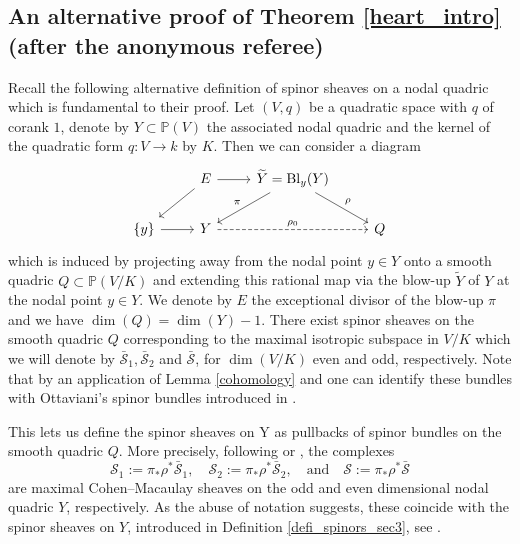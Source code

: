 \documentclass[a4paper, twoside, 11pt]{amsart}
\theoremstyle{definition}
\theoremstyle{remark}
\numberwithin{equation}{theorem}
\DeclareMathOperator{\bl}{Bl}
\begin{document}
\subsection{An alternative proof of Theorem \ref{heart_intro} (after the anonymous referee)}\label{proof_referee}
Recall the following alternative definition of spinor sheaves on a nodal quadric which is fundamental to their proof. Let $(V,q)$ be a quadratic space with $q$ of corank $1$, denote by $Y\subset \mathbb{P}(V)$ the associated nodal quadric and the kernel of the quadratic form $q\colon V \to k$ by $K$. Then we can consider a diagram 
\begin{equation*}\label{setting}
	\begin{tikzcd}
                & E \arrow[r] \arrow[ld]         & \widetilde{Y} = \bl_y(Y) \arrow[ld, "\pi"'] \arrow[rd, "\rho"] &      \\
\{y\} \arrow[r] & Y \arrow[rr, "\rho_0", dashed] &                                                                & {Q}
\end{tikzcd}
\end{equation*}
which is induced by projecting away from the nodal point $y \in Y$ onto a smooth quadric $Q \subset \mathbb{P}(V/K)$ and extending this rational map via the blow-up $\widetilde{Y}$ of $Y$ at the nodal point $y\in Y$. We denote by $E$ the exceptional divisor of the blow-up $\pi$ and we have $\dim(Q) = \dim(Y) -1$. 
There exist spinor sheaves on the smooth quadric $Q$ corresponding to the maximal isotropic subspace in $V/K$ which we will denote by $\bar{\mathcal{S}}_1,\bar{\mathcal{S}}_2$ and $\bar{\mathcal{S}}$, for $\dim(V/K)$ even and odd, respectively. Note that by an application of Lemma \ref{cohomology} and \cite[Theorem 3.5]{Ottaviani_later} one can identify these bundles with Ottaviani's spinor bundles introduced in \cite[Definition 1.3]{Ottaviani_spinors}. 

This lets us define the spinor sheaves on Y as pullbacks of spinor bundles on the smooth quadric $Q$. More precisely, following \cite[Proposition 6.4]{categorical_absorptions} or \cite[Remark 6.6]{Kawamata_SOD_ordinary_double}, the complexes 
\begin{equation*}
    \mathcal{S}_1 := \pi_*\rho^*\bar{\mathcal{S}}_1, \quad \mathcal{S}_2 := \pi_*\rho^*\bar{\mathcal{S}}_2, \quad \text{and} \quad \mathcal{S} := \pi_*\rho^*\bar{\mathcal{S}}
\end{equation*}
are maximal Cohen--Macaulay sheaves on the odd and even dimensional nodal quadric $Y$, respectively. As the abuse of notation suggests, these coincide with the spinor sheaves on $Y$, introduced in Definition \ref{defi_spinors_sec3}, see \cite[Proposition 3.8]{A2_v2}.
\end{document}
